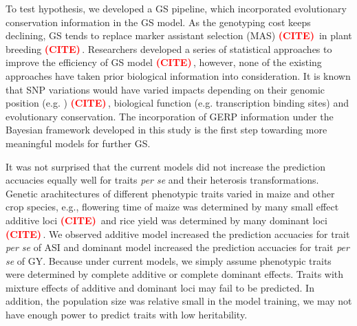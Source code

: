 \documentclass[9pt,twocolumn,twoside]{gsajnl}
\newcommand{\citex}{\textcolor{red}{\bf (CITE)\,}}
\begin{document}
To test hypothesis, we developed a GS pipeline, which incorporated evolutionary conservation information in the GS model. As the genotyping cost keeps declining, GS tends to replace marker assistant selection (MAS) \citex{} in plant breeding \citex{}. Researchers developed a series of statistical approaches to improve the efficiency of GS model \citex{}, however, none of the existing approaches have taken prior biological information into consideration. It is known that SNP variations would have varied impacts depending on their genomic position (e.g. ) \citex{}, biological function (e.g. transcription binding sites) and evolutionary conservation. The incorporation of GERP information under the Bayesian framework developed in this study is the first step towarding more meaningful models for further GS.     

It was not surprised that the current models did not increase the prediction accuacies equally well for traits \emph{per se} and their heterosis transformations. Genetic arachitectures of different phenotypic traits varied in maize and other crop species, e.g., flowering time of maize was determined by many small effect additive loci \citex{} and rice yield was determined by many dominant loci \citex{}. We observed additive model increased the prediction accuacies for trait \emph{per se} of ASI and dominant model increased the prediction accuacies for trait \emph{per se} of GY. Because under current models, we simply assume phenotypic traits were determined by complete additive or complete dominant effects. Traits with mixture effects of additive and dominant loci may fail to be predicted. In addition, the population size was relative small in the model training, we may not have enough power to predict traits with low heritability. 


\end{document}
